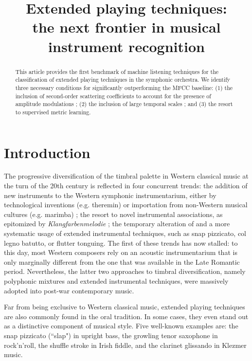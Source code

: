 \documentclass{article}
\title{Extended playing techniques: \\
the next frontier in musical instrument recognition}
\begin{document}
%
\maketitle
%
\begin{abstract}
This article provides the first benchmark of machine listening techniques for the classification of extended playing techniques in the symphonic orchestra.
We identify three necessary conditions for significantly outperforming the MFCC baseline:
(1) the inclusion of second-order scattering coefficients to account for the presence of amplitude modulations ;
(2) the inclusion of large temporal scales ; and
(3) the resort to supervised metric learning.
\end{abstract}
%
\section{Introduction}\label{sec:introduction}

The progressive diversification of the timbral palette in Western classical music at the turn of the 20th century is reflected in four concurrent trends:
the addition of new instruments to the Western symphonic instrumentarium, either by technological inventions (e.g. theremin) or importation from non-Western musical cultures (e.g. marimba) ;
the resort to novel instrumental associations, as epitomized by \emph{Klangfarbenmelodie} ;
the temporary alteration of
and a more systematic usage of extended instrumental techniques, such as snap pizzicato, col legno batutto, or flutter tonguing.
The first of these trends has now stalled: to this day, most Western composers rely on an acoustic instrumentarium that is only marginally different from the one that was available in the Late Romantic period.
Nevertheless, the latter two approaches to timbral diversification, namely polyphonic mixtures and extended instrumental techniques, were massively adopted into post-war contemporary music.



Far from being exclusive to Western classical music, extended playing techniques are also commonly found in the oral tradition.
In some cases, they even stand out as a distinctive component of musical style.
Five well-known examples are:
the snap pizzicato (``slap") in upright bass,
the growling tenor saxophone in rock'n'roll,
the shuffle stroke in Irish fiddle,
and the clarinet glissando in Klezmer music.
\end{document}
